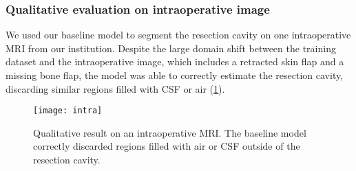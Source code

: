 \subsubsection{Qualitative evaluation on intraoperative image}

We used our baseline model to segment the resection cavity on one intraoperative \ac{MRI} from our institution.
Despite the large domain shift between the training dataset and the intraoperative image, which includes a retracted skin flap and a missing bone flap, the model was able to correctly estimate the resection cavity, discarding similar regions filled with \ac{CSF} or air (\cref{fig:intra}).

\begin{figure}
  \centering
  \texttt{[image: intra]}
  \caption[Qualitative result on an intraoperative \acs{MRI}]{
    Qualitative result on an intraoperative \ac{MRI}.
    The baseline model correctly discarded regions filled with air or \acf{CSF} outside of the resection cavity.
  }
  \label{fig:intra}
\end{figure}
